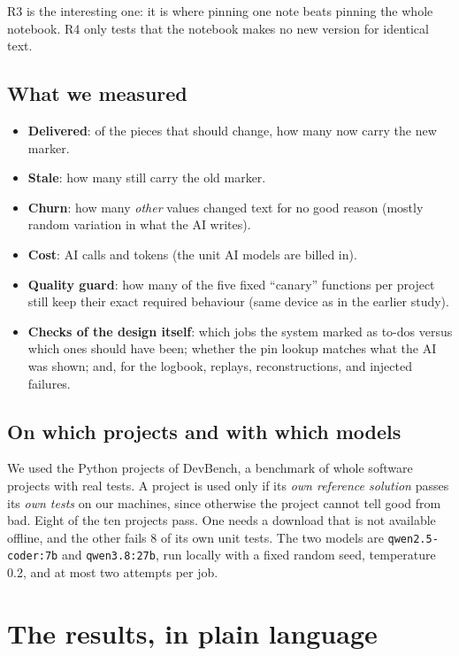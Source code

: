 \documentclass[10pt,a4paper]{article}
\newcommand{\code}[1]{\texttt{#1}}
\begin{document}
R3 is the interesting one: it is where pinning one note beats pinning the whole notebook. R4 only tests that the
notebook makes no new version for identical text.

\subsection{What we measured}

\begin{itemize}[leftmargin=*]
\item \textbf{Delivered}: of the pieces that should change, how many now carry the new marker.
\item \textbf{Stale}: how many still carry the old marker.
\item \textbf{Churn}: how many \emph{other} values changed text for no good reason (mostly random variation in what
      the AI writes).
\item \textbf{Cost}: AI calls and tokens (the unit AI models are billed in).
\item \textbf{Quality guard}: how many of the five fixed ``canary'' functions per project still keep their exact
      required behaviour (same device as in the earlier study).
\item \textbf{Checks of the design itself}: which jobs the system marked as to-dos versus which ones should have
      been; whether the pin lookup matches what the AI was shown; and, for the logbook, replays, reconstructions,
      and injected failures.
\end{itemize}

\subsection{On which projects and with which models}

We used the Python projects of DevBench, a benchmark of whole software projects with real tests. A project is
used only if its \emph{own reference solution} passes its \emph{own tests} on our machines, since otherwise
the project cannot tell good from bad. Eight of the ten projects pass. One needs a download that is not
available offline, and the other fails 8 of its own unit tests. The two models are
\code{qwen2.5-coder:7b} and \code{qwen3.8:27b}, run locally with a fixed random seed, temperature 0.2, and at most
two attempts per job.

\section{The results, in plain language}\label{sec:results}
\end{document}

